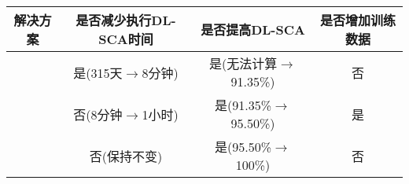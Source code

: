 {{{		\begin{table}[!h]
			\label{tab:solution2problem}
			\centering
			\scriptsize
			\begin{tabular}{c|ccc}
				\hline
				解决方案&是否减少执行DL-SCA时间&是否提高DL-SCA\zyx &是否增加训练数据\\
				\hline
				\yuchuli&是(315天$\rightarrow$8分钟)&是(无法计算$\rightarrow$91.35\%)&否\\
				\shujuzengqiang&否(8分钟$\rightarrow$1小时)&是(91.35\%$\rightarrow$95.50\%)&是\\
				\jiashejianyanguji&否(保持不变)&是(95.50\%$\rightarrow$100\%)&否\\
				\hline
			\end{tabular}
		\end{table}
		
	}
{

}}}
